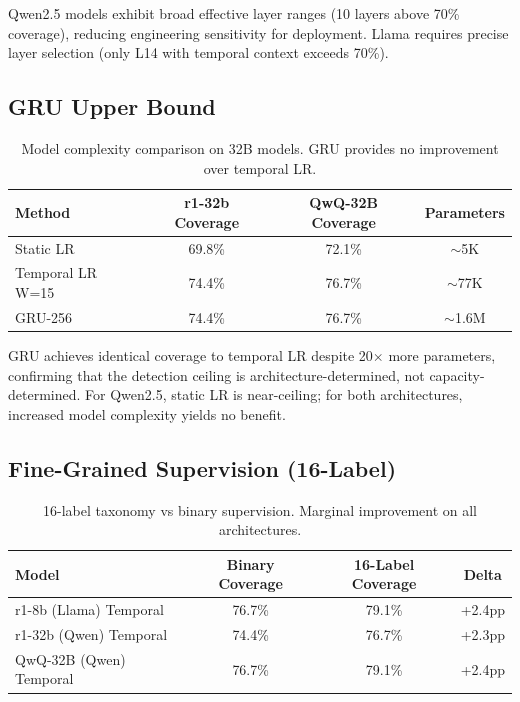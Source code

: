 \documentclass[11pt]{article}
\begin{document}
Qwen2.5 models exhibit broad effective layer ranges (10 layers above 70\% coverage), reducing engineering sensitivity for deployment. Llama requires precise layer selection (only L14 with temporal context exceeds 70\%).

\subsection{GRU Upper Bound}

\begin{table}[h]
\centering
\caption{Model complexity comparison on 32B models. GRU provides no improvement over temporal LR.}
\label{tab:gru}
\begin{tabular}{lccc}
\toprule
Method & r1-32b Coverage & QwQ-32B Coverage & Parameters \\
\midrule
Static LR & 69.8\% & 72.1\% & $\sim$5K \\
Temporal LR W=15 & 74.4\% & 76.7\% & $\sim$77K \\
GRU-256 & 74.4\% & 76.7\% & $\sim$1.6M \\
\bottomrule
\end{tabular}
\end{table}

GRU achieves identical coverage to temporal LR despite 20$\times$ more parameters, confirming that the detection ceiling is architecture-determined, not capacity-determined. For Qwen2.5, static LR is near-ceiling; for both architectures, increased model complexity yields no benefit.

\subsection{Fine-Grained Supervision (16-Label)}

\begin{table}[h]
\centering
\caption{16-label taxonomy vs binary supervision. Marginal improvement on all architectures.}
\label{tab:16label}
\begin{tabular}{lccc}
\toprule
Model & Binary Coverage & 16-Label Coverage & Delta \\
\midrule
r1-8b (Llama) Temporal & 76.7\% & 79.1\% & +2.4pp \\
r1-32b (Qwen) Temporal & 74.4\% & 76.7\% & +2.3pp \\
QwQ-32B (Qwen) Temporal & 76.7\% & 79.1\% & +2.4pp \\
\bottomrule
\end{tabular}
\end{table}
\end{document}
